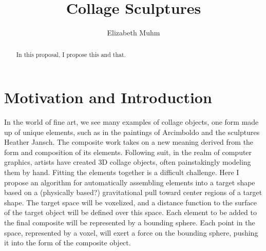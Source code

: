 \documentclass{article}
\title{Collage Sculptures}
\author{Elizabeth Muhm}
\begin{document}
\maketitle



\begin{abstract}
In this proposal, I propose this and that. 
\end{abstract}



\section{Motivation and Introduction}

In the world of fine art, we see many examples of collage objects, one form made up of unique elements, such as in the paintings of Arcimboldo and the sculptures Heather Jansch.  The composite work takes on a new meaning derived from the form and composition of its elements.  Following suit, in the realm of computer graphics, artists have created 3D collage objects, often painstakingly modeling them by hand.  Fitting the elements together is a difficult challenge.  Here I propose an algorithm for automatically assembling elements into a target shape based on a (physically based?) gravitational pull toward center regions of a target shape.  The target space will be voxelized, and a distance function to the surface of the target object will be defined over this space.  Each element to be added to the final composite will be represented by a bounding sphere.  Each point in the space, represented by a voxel, will exert a force on the bounding sphere, pushing it into the form of the composite object.
\end{document}
